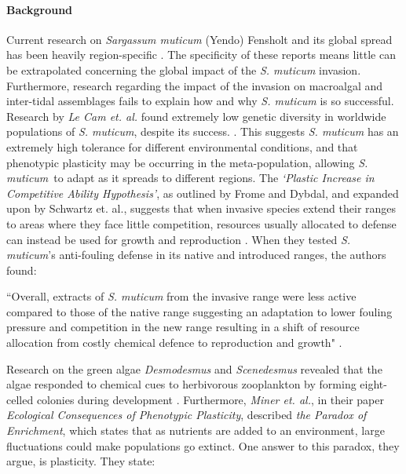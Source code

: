\documentclass[12pt]{extarticle}
\newcommand\x{\textit{S. muticum}}
\begin{document}
\paragraph{Background}
Current research on \textit{Sargassum muticum} (Yendo) Fensholt and its global spread has been heavily region-specific \cite{Britton-Simmons2004, Staehr2000, Sanchez2005}. The specificity of these reports means little can be extrapolated  concerning the global impact of the \textit{S. muticum} invasion. Furthermore,  research regarding the impact of the invasion on macroalgal and inter-tidal assemblages  fails to explain how and why \textit{S. muticum} is so successful. Research by \textit{Le Cam et. al.} found extremely low genetic diversity in worldwide populations of \textit{S. muticum}, despite its success. \cite{LeCam2019}. This suggests \textit{S. muticum} has an extremely high tolerance for different environmental conditions, and that  phenotypic plasticity may be occurring in the meta-population, allowing \x\ to adapt as it spreads to different regions. The \textit{`Plastic Increase in Competitive Ability Hypothesis’}, as outlined by Frome and Dybdal, and expanded upon by Schwartz et. al., suggests that when invasive species extend their ranges to areas where they face little competition, resources usually allocated to defense can instead be used for growth and reproduction \cite{EmblidgeFromme2006}. When they tested \textit{S. muticum}'s anti-fouling defense in its native and introduced ranges, the authors found: 
\begin{displayquote}
``Overall, extracts of \textit{S. muticum} from the invasive range were less active compared to those of the native range suggesting an adaptation to lower fouling pressure and competition in the new range resulting in a shift of resource allocation from costly chemical defence to reproduction and growth" \cite{Schwartz2017}.
\end{displayquote}
 Research on the green algae \textit{Desmodesmus} and
\textit{Scenedesmus} revealed that the algae responded to chemical cues to herbivorous zooplankton by forming eight-celled colonies during development \cite{Lurling2003}. Furthermore, \textit{Miner et. al.}, in their paper \textit{Ecological Consequences of Phenotypic Plasticity}, described \textit{the Paradox of Enrichment}, which states that as nutrients are added to an environment, large fluctuations could make populations go extinct. One answer to this paradox, they argue, is plasticity. They state: 
\end{document}
